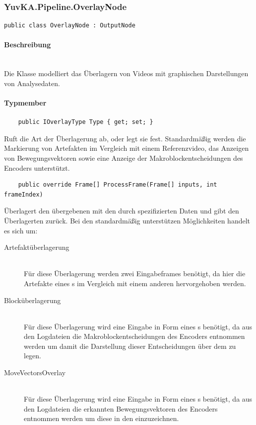 \subsubsection{YuvKA.Pipeline.OverlayNode}

\begin{verbatim}
public class OverlayNode : OutputNode
\end{verbatim}

\paragraph{Beschreibung}~\\
Die Klasse  modelliert das Überlagern von Videos mit graphischen Darstellungen von Analysedaten.

\paragraph{Typmember}
\begin{itemize}

	\begin{verbatim}
	public IOverlayType Type { get; set; }
	\end{verbatim}
	Ruft die Art der Überlagerung ab, oder legt sie fest. Standardmäßig werden die Markierung von Artefakten im Vergleich mit einem Referenzvideo, das Anzeigen von Bewegungsvektoren sowie eine Anzeige der Makroblockentscheidungen des Encoders unterstützt.

	\begin{verbatim}
	public override Frame[] ProcessFrame(Frame[] inputs, int frameIndex)
	\end{verbatim}
	Überlagert den übergebenen  mit den durch  spezifizierten Daten und gibt den Überlagerten  zurück. Bei den standardmäßig unterstützen Möglichkeiten handelt es sich um:
	\begin{description}
		\item[Artefaktüberlagerung]~\\
			Für diese Überlagerung werden zwei Eingabeframes benötigt, da hier die Artefakte eines s im Vergleich mit einem anderen hervorgehoben werden.
		\item[Blocküberlagerung]~\\
			Für diese Überlagerung wird eine Eingabe in Form eines s benötigt, da aus den Logdateien die Makroblockentscheidungen des Encoders entnommen werden um damit die Darstellung dieser Entscheidungen über dem  zu legen.
		\item[MoveVectorsOverlay]~\\
			Für diese Überlagerung wird eine Eingabe in Form eines s benötigt, da aus den Logdateien die erkannten Bewegungsvektoren des Encoders entnommen werden um diese in den  einzuzeichnen.
	\end{description}
	
\end{itemize}